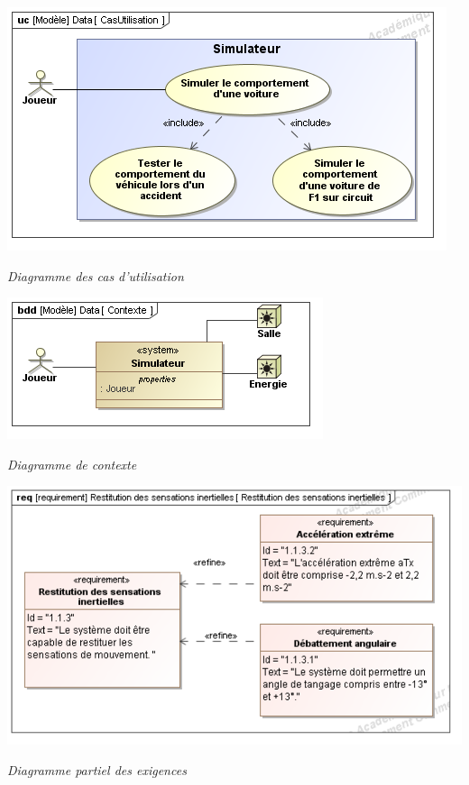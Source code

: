 \documentclass[10pt]{article}
\begin{document}
\begin{minipage}[c]{.3\linewidth}
\begin{center}
\includegraphics[width=\textwidth]{images/uc}

\textit{Diagramme des cas d'utilisation}
\end{center}
\end{minipage} \hfill
\begin{minipage}[c]{.3\linewidth}
\begin{center}
\includegraphics[width=\textwidth]{images/ct}

\textit{Diagramme de contexte}
\end{center}
\end{minipage} \hfill
\begin{minipage}[c]{.38\linewidth}
\begin{center}
\includegraphics[width=\textwidth]{images/req}

\textit{Diagramme partiel des exigences}
\end{center}
\end{minipage}
\end{document}
